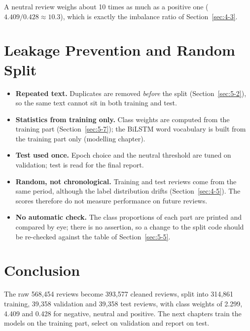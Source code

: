 A neutral review weighs about 10 times as much as a positive one ($4.409/0.428 \approx 10.3$), which is exactly the imbalance ratio of Section~\ref{sec:4-3}.

\section{Leakage Prevention and Random Split}
\label{sec:5-8}

\begin{itemize}
    \item \textbf{Repeated text.} Duplicates are removed \emph{before} the split (Section~\ref{sec:5-2}), so the same text cannot sit in both training and test.
    \item \textbf{Statistics from training only.} Class weights are computed from the training part (Section~\ref{sec:5-7}); the BiLSTM word vocabulary is built from the training part only (modelling chapter).
    \item \textbf{Test used once.} Epoch choice and the neutral threshold are tuned on validation; test is read for the final report.
    \item \textbf{Random, not chronological.} Training and test reviews come from the same period, although the label distribution drifts (Section~\ref{sec:4-5}). The scores therefore do not measure performance on future reviews.
    \item \textbf{No automatic check.} The class proportions of each part are printed and compared by eye; there is no assertion, so a change to the split code should be re-checked against the table of Section~\ref{sec:5-5}.
\end{itemize}

\section{Conclusion}
\label{sec:5-9}

The raw 568{,}454 reviews become 393{,}577 cleaned reviews, split into 314{,}861 training, 39{,}358 validation and 39{,}358 test reviews, with class weights of 2.299, 4.409 and 0.428 for negative, neutral and positive. The next chapters train the models on the training part, select on validation and report on test.
